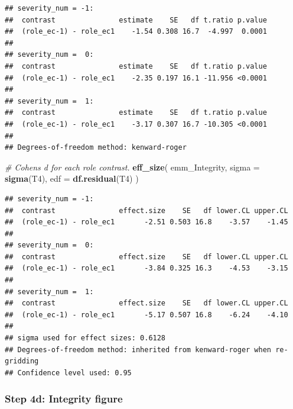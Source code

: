 \documentclass[
]{article}
\newenvironment{Shaded}{\begin{snugshade}}{\end{snugshade}}
\newcommand{\AttributeTok}[1]{\textcolor[rgb]{0.13,0.29,0.53}{#1}}
\newcommand{\CommentTok}[1]{\textcolor[rgb]{0.56,0.35,0.01}{\textit{#1}}}
\newcommand{\FunctionTok}[1]{\textcolor[rgb]{0.13,0.29,0.53}{\textbf{#1}}}
\newcommand{\NormalTok}[1]{#1}
\begin{document}
\begin{verbatim}
## severity_num = -1:
##  contrast               estimate    SE   df t.ratio p.value
##  (role_ec-1) - role_ec1    -1.54 0.308 16.7  -4.997  0.0001
## 
## severity_num =  0:
##  contrast               estimate    SE   df t.ratio p.value
##  (role_ec-1) - role_ec1    -2.35 0.197 16.1 -11.956 <0.0001
## 
## severity_num =  1:
##  contrast               estimate    SE   df t.ratio p.value
##  (role_ec-1) - role_ec1    -3.17 0.307 16.7 -10.305 <0.0001
## 
## Degrees-of-freedom method: kenward-roger
\end{verbatim}

\begin{Shaded}
\begin{Highlighting}[]
\CommentTok{\# Cohen\textquotesingle{}s d for each role contrast.}
\FunctionTok{eff\_size}\NormalTok{(}
\NormalTok{  emm\_Integrity,}
  \AttributeTok{sigma =} \FunctionTok{sigma}\NormalTok{(T4),}
  \AttributeTok{edf =} \FunctionTok{df.residual}\NormalTok{(T4)}
\NormalTok{)}
\end{Highlighting}
\end{Shaded}

\begin{verbatim}
## severity_num = -1:
##  contrast               effect.size    SE   df lower.CL upper.CL
##  (role_ec-1) - role_ec1       -2.51 0.503 16.8    -3.57    -1.45
## 
## severity_num =  0:
##  contrast               effect.size    SE   df lower.CL upper.CL
##  (role_ec-1) - role_ec1       -3.84 0.325 16.3    -4.53    -3.15
## 
## severity_num =  1:
##  contrast               effect.size    SE   df lower.CL upper.CL
##  (role_ec-1) - role_ec1       -5.17 0.507 16.8    -6.24    -4.10
## 
## sigma used for effect sizes: 0.6128 
## Degrees-of-freedom method: inherited from kenward-roger when re-gridding 
## Confidence level used: 0.95
\end{verbatim}

\subsubsection{Step 4d: Integrity
figure}\label{step-4d-integrity-figure}
\end{document}
